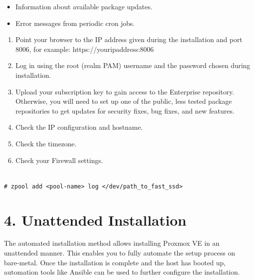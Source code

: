 \begin{itemize}[leftmargin=2cm]

	\item Information about available package updates.

	\item Error messages from periodic cron jobs.

\end{itemize}

\begin{enumerate}[leftmargin=2cm]

	\item Point your browser to the IP address given during the installation and port 8006, for example: https://youripaddress:8006

	\item Log in using the root (realm PAM) username and the password chosen during installation.

	\item Upload your subscription key to gain access to the Enterprise repository. Otherwise, you will need to set up one of the public, less tested package repositories to get updates for security fixes, bug fixes, and new features.

	\item Check the IP configuration and hostname.

	\item Check the timezone.

	\item Check your Firewall settings.

\end{enumerate}

\begin{lstlisting}

# zpool add <pool-name> log </dev/path_to_fast_ssd>

\end{lstlisting}


\section{4. Unattended Installation}

The automated installation method allows installing Proxmox VE in an unattended manner. This enables you to fully automate the setup process on bare-metal. Once the installation is complete and the host has booted up, automation tools like Ansible can be used to further configure the installation.

